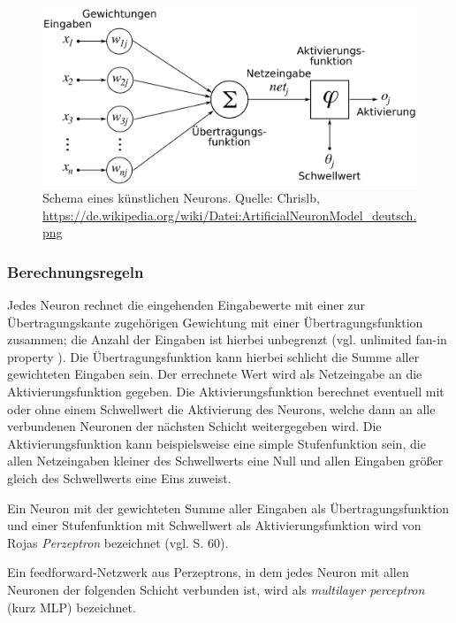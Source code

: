 \documentclass[
	12pt,
	a4paper,
	BCOR10mm,
	DIV14,
	listof=totoc,
	bibliography=totoc,
	headsepline
]{scrreprt}
\begin{document}
\begin{figure}[h]
	\begin{center}
		\includegraphics[totalheight=0.2\textheight]{Bilder/ArtificialNeuronModel_deutsch.png}
	\end{center}
	\caption{Schema eines künstlichen Neurons. Quelle: Chrislb, \url{https://de.wikipedia.org/wiki/Datei:ArtificialNeuronModel_deutsch.png}} %
	\label{fig:Neuron}
\end{figure}

\subsubsection{Berechnungsregeln}
Jedes Neuron rechnet die eingehenden Eingabewerte mit einer zur Übertragungskante zugehörigen Gewichtung mit einer Übertragungsfunktion zusammen; die Anzahl der Eingaben ist hierbei unbegrenzt (vgl. \glqq unlimited fan-in property\grqq{} \cite{Rojas:1996:NNS:235222}). Die Übertragungsfunktion kann hierbei schlicht die Summe aller gewichteten Eingaben sein. Der errechnete Wert wird als Netzeingabe an die Aktivierungsfunktion gegeben. 
Die Aktivierungsfunktion berechnet eventuell mit oder ohne einem Schwellwert die Aktivierung des Neurons, welche dann an alle verbundenen Neuronen der nächsten Schicht weitergegeben wird.
Die Aktivierungsfunktion kann beispielsweise eine simple Stufenfunktion sein, die allen Netzeingaben kleiner des Schwellwerts eine Null und allen Eingaben größer gleich des Schwellwerts eine Eins zuweist.

Ein Neuron mit der gewichteten Summe aller Eingaben als Übertragungsfunktion und einer Stufenfunktion mit Schwellwert als Aktivierungsfunktion wird von Rojas \textit{Perzeptron} bezeichnet (vgl. \cite{Rojas:1996:NNS:235222} S. 60).
\medskip

Ein feedforward-Netzwerk aus Perzeptrons, in dem jedes Neuron mit allen Neuronen der folgenden Schicht verbunden ist, wird als \textit{multilayer perceptron} (kurz MLP) bezeichnet.
\end{document}
